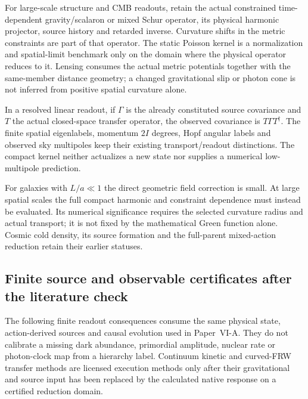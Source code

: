 \documentclass[12pt,a4paper]{article}
\begin{document}
\begin{remark}
\label{p9:rem:v2204-observational-kernel-scope}
For large-scale structure and CMB readouts, retain the actual constrained
time-dependent gravity/scalaron or mixed Schur operator, its physical harmonic
projector, source history and retarded inverse. Curvature shifts in the metric
constraints are part of that operator. The static Poisson kernel is a
normalization and spatial-limit benchmark only on the domain where the
physical operator reduces to it. Lensing consumes the actual metric
potentials together with the same-member distance geometry; a changed
gravitational slip or photon cone is not inferred from positive spatial
curvature alone.

In a resolved linear readout, if $\Gamma$ is the already constituted source
covariance and $T$ the actual closed-space transfer operator, the observed
covariance is $T\Gamma T^\dagger$. The finite spatial eigenlabels, momentum
$2I$ degrees, Hopf angular labels and observed sky multipoles keep their
existing transport/readout distinctions. The compact kernel neither
actualizes a new state nor supplies a numerical low-multipole prediction.

For galaxies with $L/a\ll1$ the direct geometric field correction is small.
At large spatial scales the full compact harmonic and constraint dependence
must instead be evaluated. Its numerical significance requires the selected
curvature radius and actual transport; it is not fixed by the mathematical
Green function alone. Cosmic cold density, its source formation and the
full-parent mixed-action reduction retain their earlier statuses.
\end{remark}


\subsection{Finite source and observable certificates after the literature check}
\label{p6b:sec:v2210-lit-readout-certificates}
The following finite readout consequences consume the same physical state,
action-derived sources and causal evolution used in Paper~VI-A. They do
not calibrate a missing dark abundance, primordial amplitude, nuclear rate
or photon-clock map from a hierarchy label. Continuum kinetic and
curved-FRW transfer methods
\cite{LitCOSMaBertschinger1995,LitCOSHuEtAl1998} are licensed execution
methods only after their gravitational and source input has been replaced
by the calculated native response on a certified reduction domain.
\end{document}
